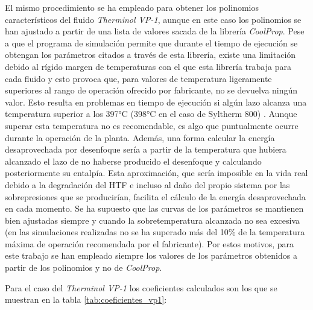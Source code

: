 El mismo procedimiento se ha empleado para obtener los polinomios característicos del fluido \emph{Therminol VP-1}, aunque en este caso los polinomios se han ajustado a partir de una lista de valores sacada de la librería \emph{CoolProp}. Pese a que el programa de simulación permite que durante el tiempo de ejecución se obtengan los parámetros citados a través de esta librería, existe una limitación debido al rígido margen de temperaturas con el que esta librería trabaja para cada fluido y esto
provoca que, para valores de temperatura ligeramente superiores al rango de operación ofrecido por fabricante, no se devuelva ningún valor. Esto resulta en problemas en tiempo de ejecución si algún lazo alcanza una temperatura superior a los 397°C (398°C en el caso de Syltherm 800) . Aunque superar esta temperatura no es recomendable, es algo que puntualmente ocurre durante la operación de la planta. Además, una forma calcular la energía desaprovechada por desenfoque sería a partir de la temperatura que hubiera alcanzado el lazo de no haberse producido el desenfoque y calculando posteriormente su entalpía. Esta aproximación, que sería imposible en la vida real debido a la degradación del HTF e incluso al daño del propio sistema por las sobrepresiones que se producirían, facilita el cálculo de la energía desaprovechada en cada  momento. Se ha supuesto que las curvas de los parámetros se mantienen bien ajustadas siempre y cuando la sobretemperatura alcanzada no sea excesiva (en las simulaciones realizadas no se ha superado más del 10\% de la temperatura máxima de operación recomendada por el fabricante). Por estos motivos, para este trabajo se han empleado siempre los valores de los parámetros obtenidos a partir de los polinomios y no de \emph{CoolProp}.

Para el caso del \emph{Therminol VP-1} los coeficientes calculados son los que se muestran en la tabla \ref{tab:coeficientes_vp1}:

